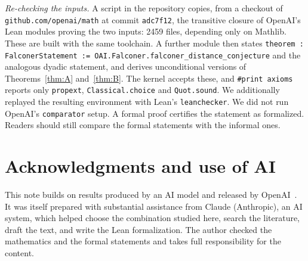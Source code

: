 \documentclass[11pt]{amsart}
\theoremstyle{definition}
\theoremstyle{remark}
\begin{document}
\begin{sloppypar}
\emph{Re-checking the inputs.} A script in the repository copies, from a checkout of
\texttt{github.com/openai/math} at commit \texttt{adc7f12}, the transitive closure of OpenAI's Lean
modules proving the two inputs: 2459 files, depending only on Mathlib. These are built with the
same toolchain. A further module then states
\texttt{theorem : FalconerStatement := OAI.Falconer.falconer\_distance\_conjecture} and the
analogous dyadic statement, and derives unconditional versions of Theorems~\ref{thm:A} and~\ref{thm:B}.
The kernel accepts these, and \texttt{\#print axioms} reports only \texttt{propext},
\texttt{Classical.choice} and \texttt{Quot.sound}. We additionally replayed the resulting environment
with Lean's \texttt{leanchecker}. We did not run OpenAI's \texttt{comparator} setup. A formal proof
certifies the statement as formalized. Readers should still compare the formal statements with
the informal ones.
\end{sloppypar}

\section*{Acknowledgments and use of AI}
This note builds on results produced by an AI model and released by OpenAI~\cite{OAIFalconer,OAIDyadic}.
It was itself prepared with substantial assistance from Claude (Anthropic), an AI system, which
helped choose the combination studied here, search the literature, draft the text, and write
the Lean formalization. The author checked the mathematics and the formal statements and takes
full responsibility for the content.



\end{document}
